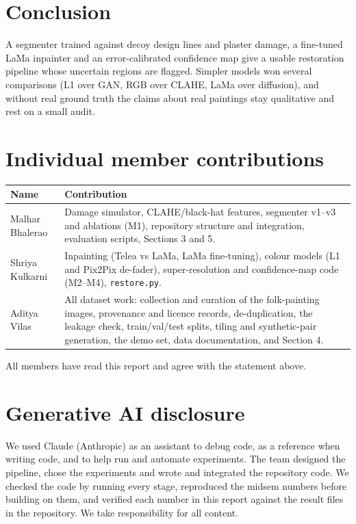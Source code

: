 \documentclass[11pt,a4paper,twocolumn]{article}
\begin{document}
\section{Conclusion}
A segmenter trained against decoy design lines and plaster damage, a fine-tuned LaMa inpainter and an error-calibrated confidence map give a usable restoration pipeline whose uncertain regions are flagged. Simpler models won several comparisons (L1 over GAN, RGB over CLAHE, LaMa over diffusion), and without real ground truth the claims about real paintings stay qualitative and rest on a small audit.

\section*{Individual member contributions}
{\small
\begin{tabularx}{\linewidth}{@{}l X@{}}
\toprule
Name & Contribution \\
\midrule
Malhar Bhalerao & Damage simulator, CLAHE/black-hat features, segmenter v1--v3 and ablations (M1), repository structure and integration, evaluation scripts, Sections 3 and 5. \\
Shriya Kulkarni & Inpainting (Telea vs LaMa, LaMa fine-tuning), colour models (L1 and Pix2Pix de-fader), super-resolution and confidence-map code (M2--M4), \texttt{restore.py}. \\
Aditya Vilas & All dataset work: collection and curation of the folk-painting images, provenance and licence records, de-duplication, the leakage check, train/val/test splits, tiling and synthetic-pair generation, the demo set, data documentation, and Section 4. \\
\bottomrule
\end{tabularx}}

\smallskip
\noindent All members have read this report and agree with the statement above.

\section*{Generative AI disclosure}
We used Claude (Anthropic) as an assistant to debug code, as a reference when writing code, and to help run and automate experiments. The team designed the pipeline, chose the experiments and wrote and integrated the repository code. We checked the code by running every stage, reproduced the midsem numbers before building on them, and verified each number in this report against the result files in the repository. We take responsibility for all content.
\end{document}
